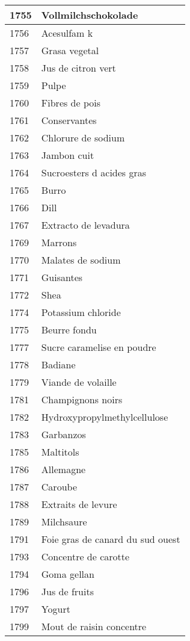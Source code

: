 \begin{longtable}{|l|l|}
1755 & Vollmilchschokolade \\ \hline 
1756 & Acesulfam k \\ \hline 
1757 & Grasa vegetal \\ \hline 
1758 & Jus de citron vert \\ \hline 
1759 & Pulpe \\ \hline 
1760 & Fibres de pois \\ \hline 
1761 & Conservantes \\ \hline 
1762 & Chlorure de sodium \\ \hline 
1763 & Jambon cuit \\ \hline 
1764 & Sucroesters d acides gras \\ \hline 
1765 & Burro \\ \hline 
1766 & Dill \\ \hline 
1767 & Extracto de levadura \\ \hline 
1769 & Marrons \\ \hline 
1770 & Malates de sodium \\ \hline 
1771 & Guisantes \\ \hline 
1772 & Shea \\ \hline 
1774 & Potassium chloride \\ \hline 
1775 & Beurre fondu \\ \hline 
1777 & Sucre caramelise en poudre \\ \hline 
1778 & Badiane \\ \hline 
1779 & Viande de volaille \\ \hline 
1781 & Champignons noirs \\ \hline 
1782 & Hydroxypropylmethylcellulose \\ \hline 
1783 & Garbanzos \\ \hline 
1785 & Maltitols \\ \hline 
1786 & Allemagne \\ \hline 
1787 & Caroube \\ \hline 
1788 & Extraits de levure \\ \hline 
1789 & Milchsaure \\ \hline 
1791 & Foie gras de canard du sud ouest \\ \hline 
1793 & Concentre de carotte \\ \hline 
1794 & Goma gellan \\ \hline 
1796 & Jus de fruits \\ \hline 
1797 & Yogurt \\ \hline 
1799 & Mout de raisin concentre \\ \hline 

\end{longtable}
